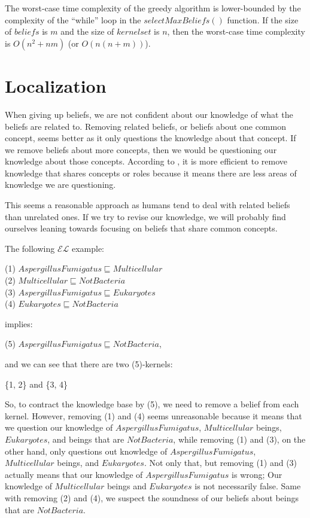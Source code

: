 The worst-case time complexity of the greedy algorithm is lower-bounded by the complexity of the ``while'' loop in the $selectMaxBeliefs()$ function. If the size of $beliefs$ is $m$ and the size of $kernelset$ is $n$, then the worst-case time complexity is $O(n^2 + nm)$ (or $O(n(n+m))$).

\section{Localization}
When giving up beliefs, we are not confident about our knowledge of what the beliefs are related to. Removing related beliefs, or beliefs about one common concept, seems better as it only questions the knowledge about that concept. If we remove beliefs about more concepts, then we would be questioning our knowledge about those concepts. According to \cite{zwei}, it is more efficient to remove knowledge that shares concepts or roles because it means there are less areas of knowledge we are questioning.

This seems a reasonable approach as humans tend to deal with related beliefs than unrelated ones. If we try to revise our knowledge, we will probably find ourselves leaning towards focusing on beliefs that share common concepts. 

The following $\mathcal{EL}$ example:
\begin{center}
(1) $AspergillusFumigatus \sqsubseteq Multicellular $ \\
(2) $Multicellular \sqsubseteq NotBacteria$ \\
(3) $AspergillusFumigatus \sqsubseteq Eukaryotes$ \\
(4) $Eukaryotes \sqsubseteq NotBacteria$ 
\end{center}
implies:
\begin{center}
(5) $AspergillusFumigatus \sqsubseteq NotBacteria$,
\end{center}
and we can see that there are two (5)-kernels:
\begin{center}
\{1, 2\} and \{3, 4\}
\end{center}

So, to contract the knowledge base by (5), we need to remove a belief from each kernel. However, removing (1) and (4) seems unreasonable because it means that we question our knowledge of $AspergillusFumigatus$, $Multicellular$ beings, $Eukaryotes$, and beings that are $NotBacteria$, while removing (1) and (3), on the other hand, only questions out knowledge of $AspergillusFumigatus$, $Multicellular$ beings, and $Eukaryotes$. Not only that, but removing (1) and (3) actually means that our knowledge of $AspergillusFumigatus$ is wrong; Our knowledge of $Multicellular$ beings and $Eukaryotes$ is not necessarily false. Same with removing (2) and (4), we suspect the soundness of our beliefs about beings that are $NotBacteria$.

